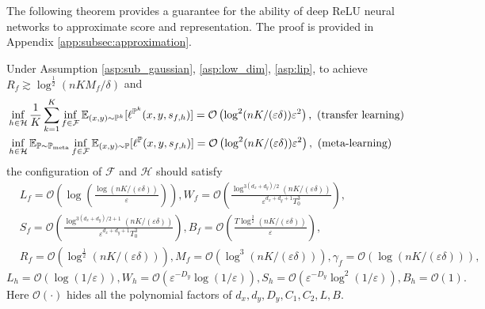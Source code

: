 \documentclass[11pt]{article}
\numberwithin{equation}{section}
\newcommand{\Pmeta}{\mathbb{P}_{\text{meta}}}
\renewcommand{\P}{\mathbb{P}}
\begin{document}
The following theorem provides a guarantee for the ability of deep ReLU neural networks to approximate score and representation.
The proof is provided in Appendix \ref{app:subsec:approximation}.
\begin{thm}\label{thm:approximation_all_informal}
     Under Assumption \ref{asp:sub_gaussian}, \ref{asp:low_dim}, \ref{asp:lip}, to achieve $R_f\gtrsim\log^{\frac{1}{2}}(nKM_f/\delta)$ and
    \begin{align}
        &\inf_{h\in\mathcal{H}} \frac{1}{K}\sum_{k=1}^K \inf_{f\in\mathcal{F}}\E_{(x,y)\sim\P^k} [\ell^{\P^k} (x,y,s_{f,h})] = \mathcal{O}\left(\log^2(nK/(\varepsilon\delta))\varepsilon^2\right), \text{ (transfer learning)} \\
        &\inf_{h\in\mathcal{H}}\E_{\P\sim\Pmeta}\inf_{f\in\mathcal{F}}\E_{(x,y)\sim\P} [\ell^\P(x,y,s_{f,h})] = \mathcal{O}\left(\log^2(nK/(\varepsilon\delta))\varepsilon^2\right), \text{ (meta-learning)}
    \end{align}
    the configuration of $\mathcal{F}$ and $\mathcal{H}$ should satisfy
    \begin{equation}
        \begin{aligned}
            &L_f=\mathcal{O}\left(\log\left(\frac{\log(nK/(\varepsilon\delta))}{\varepsilon}\right)\right),
            W_f=\mathcal{O}\left(\frac{\log^{3(d_x+d_y)/2}(nK/(\varepsilon\delta))}{\varepsilon^{d_x+d_y+1}T_0^3}\right), \\
            &S_f=\mathcal{O}\left(\frac{\log^{3(d_x+d_y)/2+1}(nK/(\varepsilon\delta))}{\varepsilon^{d_x+d_y+1}T_0^3}\right),
            B_f=\mathcal{O}\left(\frac{T\log^{\frac{3}{2}}(nK/(\varepsilon\delta))}{\varepsilon}\right), \\
            &R_f=\mathcal{O}\left(\log^{\frac{1}{2}}(nK/(\varepsilon\delta))\right), 
            M_f=\mathcal{O}\left(\log^3(nK/(\varepsilon\delta))\right),
            \gamma_f=\mathcal{O}\left(\log(nK/(\varepsilon\delta))\right),
        \end{aligned}
    \end{equation}
     \begin{equation}
        L_h=\mathcal{O}\left(\log(1/\varepsilon)\right), W_h=\mathcal{O}\left(\varepsilon^{-D_y}\log(1/\varepsilon)\right), 
        S_h=\mathcal{O}\left(\varepsilon^{-D_y}\log^2(1/\varepsilon)\right),
        B_h = \mathcal{O}(1).
    \end{equation}
    Here $\mathcal{O}(\cdot)$ hides all the polynomial factors of $d_x,d_y,D_y,C_1,C_2,L,B$.
\end{thm}
\end{document}
